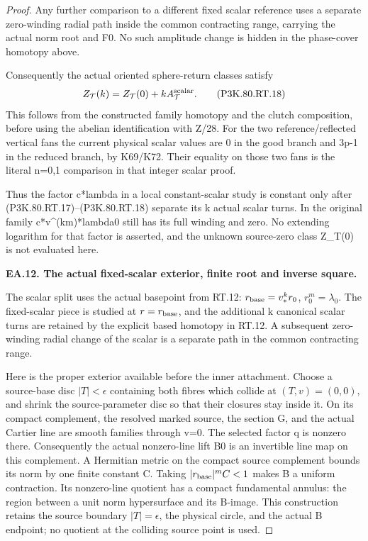 \begin{proof}
Any further comparison to a different fixed scalar reference uses
a separate zero-winding radial path inside the common contracting
range, carrying the actual norm root and F0. No such amplitude change
is hidden in the phase-cover homotopy above.

Consequently the actual oriented sphere-return classes satisfy
\[
 Z_{\mathcal T}(k)=Z_{\mathcal T}(0)
                      +k A^{\rm scalar}_{\mathcal T}.   \tag{P3K.80.RT.18}
\]
This follows from the constructed family homotopy and the clutch
composition, before using the abelian identification with Z/28.
For the two reference/reflected vertical fans the current physical
scalar values are 0 in the good branch and 3p-1 in the reduced
branch, by K69/K72. Their equality on those two fans is the literal
n=0,1 comparison in that integer scalar proof.

Thus the factor c*lambda in a local constant-scalar study is
constant only after (P3K.80.RT.17)--(P3K.80.RT.18) separate its k actual scalar
turns. In the original family c*v\textasciicircum{}(km)*lambda0 still has its full
winding and zero. No extending logarithm for that factor is asserted,
and the unknown source-zero class Z\_T(0) is not evaluated here.

\par\medskip\noindent\textbf{EA.12. The actual fixed-scalar exterior, finite root and inverse square.}\par\nopagebreak[4]

The scalar split uses the actual basepoint from RT.12:
\(r_{\rm base}=v_*^k r_0\), \(r_0^m=\lambda_0\).
The fixed-scalar piece is studied at \(r=r_{\rm base}\), and the
additional k canonical scalar turns are retained by the explicit
based homotopy in RT.12. A subsequent zero-winding radial change of
the scalar is a separate path in the common contracting range.

Here is the proper exterior available before the inner attachment.
Choose a source-base disc \(|T|<\epsilon\) containing both fibres
which collide at \((T,v)=(0,0)\), and shrink the source-parameter
disc so that their closures stay inside it. On its compact complement,
the resolved marked source, the section G, and the actual Cartier line
are smooth families through v=0. The selected factor q is nonzero
there. Consequently the actual nonzero-line lift B0 is an invertible
line map on this complement. A Hermitian metric on the compact
source complement bounds its norm by one finite constant C. Taking
\(|r_{\rm base}|^m C<1\) makes B a uniform contraction. Its
nonzero-line quotient has a compact fundamental annulus: the region
between a unit norm hypersurface and its B-image. This construction
retains the source boundary \(|T|=\epsilon\), the physical circle,
and the actual B endpoint; no quotient at the colliding source point
is used.


\end{proof}
